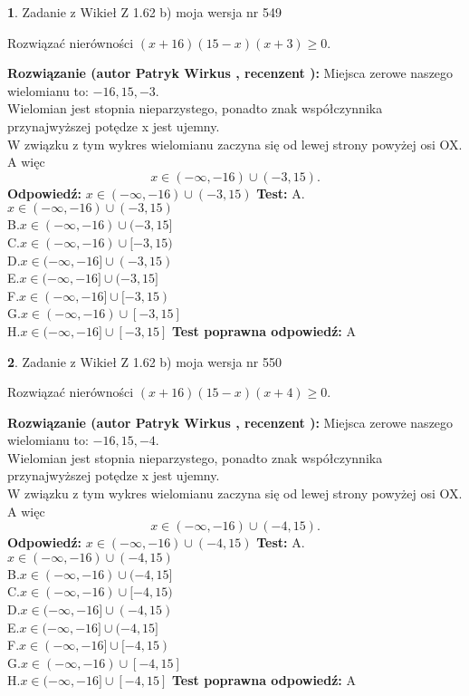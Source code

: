 \documentclass[12pt, a4paper]{article}
\theoremstyle{definition} %
\newtheorem{zad}{}
\newcommand{\zadStart}[1]{\begin{zad}#1\newline}
\newcommand{\zadStop}{\end{zad}}
\newcommand{\rozwStart}[2]{\noindent \textbf{Rozwiązanie (autor #1 , recenzent #2): }\newline}
\newcommand{\rozwStop}{\newline}
\newcommand{\odpStart}{\noindent \textbf{Odpowiedź:}\newline}
\newcommand{\odpStop}{\newline}
\newcommand{\testStart}{\noindent \textbf{Test:}\newline}
\newcommand{\testStop}{\newline}
\newcommand{\kluczStart}{\noindent \textbf{Test poprawna odpowiedź:}\newline}
\newcommand{\kluczStop}{\newline}
\begin{document}
\zadStart{Zadanie z Wikieł Z 1.62 b) moja wersja nr 549}

Rozwiązać nierówności $(x+16)(15-x)(x+3)\ge0$.
\zadStop
\rozwStart{Patryk Wirkus}{}
Miejsca zerowe naszego wielomianu to: $-16, 15, -3$.\\
Wielomian jest stopnia nieparzystego, ponadto znak współczynnika przy\linebreak najwyższej potędze x jest ujemny.\\ W związku z tym wykres wielomianu zaczyna się od lewej strony powyżej osi OX. A więc $$x \in (-\infty,-16) \cup (-3,15).$$
\rozwStop
\odpStart
$x \in (-\infty,-16) \cup (-3,15)$
\odpStop
\testStart
A.$x \in (-\infty,-16) \cup (-3,15)$\\
B.$x \in (-\infty,-16) \cup (-3,15]$\\
C.$x \in (-\infty,-16) \cup [-3,15)$\\
D.$x \in (-\infty,-16] \cup (-3,15)$\\
E.$x \in (-\infty,-16] \cup (-3,15]$\\
F.$x \in (-\infty,-16] \cup [-3,15)$\\
G.$x \in (-\infty,-16) \cup [-3,15]$\\
H.$x \in (-\infty,-16] \cup [-3,15]$
\testStop
\kluczStart
A
\kluczStop



\zadStart{Zadanie z Wikieł Z 1.62 b) moja wersja nr 550}

Rozwiązać nierówności $(x+16)(15-x)(x+4)\ge0$.
\zadStop
\rozwStart{Patryk Wirkus}{}
Miejsca zerowe naszego wielomianu to: $-16, 15, -4$.\\
Wielomian jest stopnia nieparzystego, ponadto znak współczynnika przy\linebreak najwyższej potędze x jest ujemny.\\ W związku z tym wykres wielomianu zaczyna się od lewej strony powyżej osi OX. A więc $$x \in (-\infty,-16) \cup (-4,15).$$
\rozwStop
\odpStart
$x \in (-\infty,-16) \cup (-4,15)$
\odpStop
\testStart
A.$x \in (-\infty,-16) \cup (-4,15)$\\
B.$x \in (-\infty,-16) \cup (-4,15]$\\
C.$x \in (-\infty,-16) \cup [-4,15)$\\
D.$x \in (-\infty,-16] \cup (-4,15)$\\
E.$x \in (-\infty,-16] \cup (-4,15]$\\
F.$x \in (-\infty,-16] \cup [-4,15)$\\
G.$x \in (-\infty,-16) \cup [-4,15]$\\
H.$x \in (-\infty,-16] \cup [-4,15]$
\testStop
\kluczStart
A
\kluczStop
\end{document}
